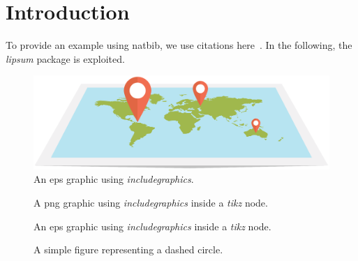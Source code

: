 \section{Introduction}
\label{sec:introduction}

To provide an example using natbib, we use citations here~\cite{Jackson,Moore}.
In the following, the \emph{lipsum} package is exploited.

\lipsum[1-4]

\begin{figure}
    \centering
    \includegraphics[width=0.4\columnwidth]{./figs/flatEarthEPS}
    \caption{An eps graphic using \emph{includegraphics}.}
    \label{fig:flatEarthEPS}
\end{figure}

\lipsum[5-6]

\begin{figure}
    \centering
    \caption{A png graphic using \emph{includegraphics} inside a \emph{tikz} node.}
 \label{fig:flatEarthPNGinTIKZ}
\end{figure}

\lipsum[7-10]

\begin{figure}
    \centering
    \caption{An eps graphic using \emph{includegraphics} inside a \emph{tikz} node.}
 \label{fig:flatEarthEPSinTIKZ}
\end{figure}

\lipsum[11]

\begin{figure}
    \centering
    
    \caption{A simple figure representing a dashed circle.}
    \label{fig:wireCrossSection}
\end{figure}

\lipsum[12]
